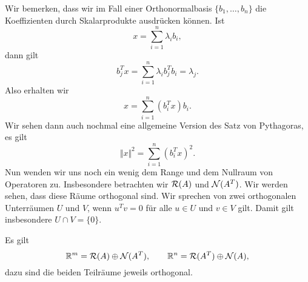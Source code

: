 Wir bemerken, dass wir im Fall einer Orthonormalbasis \(\{b_1,\ldots,b_n\}\) die Koeffizienten durch Skalarprodukte ausdrücken können. Ist
\begin{equation*}
 x = \sum_{i=1}^n \lambda_i b_i,
\end{equation*}
dann gilt
\begin{equation*}
 b_j^T x = \sum_{i=1}^n \lambda_i b_j^T b_i = \lambda_j.
\end{equation*}
Also erhalten wir
\begin{equation*}
 x= \sum_{i=1}^n (b_i^T x) b_i.
\end{equation*}
Wir sehen dann auch nochmal eine allgemeine Version des Satz von Pythagoras, es gilt
\begin{equation*}
 \Vert x \Vert^2 = \sum_{i=1}^n (b_i^T x)^2.
\end{equation*}
Nun wenden wir uns noch ein wenig dem Range und dem Nullraum von Operatoren zu. Insbesondere betrachten wir \({\cal R}(A)\) und \({\cal N}(A^T)\). Wir werden sehen, dass diese Räume orthogonal sind. Wir sprechen von zwei orthogonalen Unterräumen \(U\) und \(V\), wenn \(u^T v = 0\) für alle \(u \in U\) und \(v \in V\) gilt. Damit gilt insbesondere \(U \cap V = \{0\}\).
\label{vektorraeume/LGS:theorem-5}
\begin{theorem}{}{}



Es gilt
\begin{equation*}
 \mathbb{R}^m  = {\cal R}(A) \oplus {\cal N}(A^T), \qquad \mathbb{R}^n = {\cal R}(A^T) \oplus {\cal N}(A ),
\end{equation*}
dazu sind die beiden Teilräume jeweils orthogonal.
\end{theorem}

